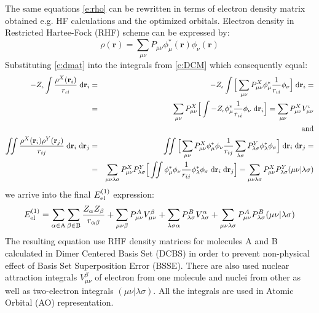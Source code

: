 \documentclass[a4paper,titlepage,twoside,fleqn]{article}
\begin{document}
The same equations \ref{e:rho} can be rewritten in terms of
electron density matrix obtained e.g. HF calculations and
the optimized orbitals. Electron density in Restricted Hartee-Fock
(RHF) scheme can be expressed by:
\begin{equation}\label{e:dmat}
\rho(\mathbf{r}) = \sum_{\mu\nu} P_{\mu\nu} \phi_{\mu}^{*}(\mathbf{r})  \phi_{\nu}(\mathbf{r})
\end{equation}   
Substituting \ref{e:dmat} into the integrals from \ref{e:DCM} 
which consequently equal:
\begin{eqnarray}
-Z_{\iota}\int \frac{\rho^X({\bf r}_i)  }{r_{\iota i}} \;{\rm d}{\bf r}_i 
&=&
-Z_{\iota}\int \Big[
     \sum_{\mu\nu} P^X_{\mu\nu} \phi_{\mu}^{*} \frac{1}{r_{\iota i}} \phi_{\nu} 
     \Big] \;{\rm d}{\bf r}_i = \\ \nonumber
&=&
\sum_{\mu\nu} P^X_{\mu\nu} 
 \Big[
 \int -Z_{\iota}\phi_{\mu}^{*} \frac{1}{r_{\iota i}} \phi_{\nu}\;{\rm d}{\bf r}_i
 \Big] %
=
\sum_{\mu\nu} P^X_{\mu\nu} V_{\mu\nu}^{\iota} \\\nonumber 
&&\textrm{  and}\\
%
\iint \frac{\rho^X({\bf r}_i)\rho^Y({\bf r}_j)  }{r_{ij}} \;{\rm d}{\bf r}_i \;{\rm d}{\bf r}_j 
&=&
\iint \Big[
       \sum_{\mu\nu} P^X_{\mu\nu} \phi_{\mu}^{*} \phi_{\nu} 
       \frac{1}{r_{ij}} 
       \sum_{\lambda\sigma} P^Y_{\lambda\sigma} \phi_{\lambda}^{*} \phi_{\sigma}
       \Big] 
       \;{\rm d}{\bf r}_i \;{\rm d}{\bf r}_j = \\ \nonumber
&=&
\sum_{\mu\nu\lambda\sigma} P^X_{\mu\nu} P^Y_{\lambda\sigma} 
   \Big[
     \iint \phi_{\mu}^{*} \phi_{\nu} 
           \frac{1}{r_{ij}} 
           \phi_{\lambda}^{*} \phi_{\sigma}
           \;{\rm d}{\bf r}_i \;{\rm d}{\bf r}_j
   \Big] 
=
\sum_{\mu\nu\lambda\sigma} P^X_{\mu\nu} P^Y_{\lambda\sigma}
(\mu\nu|\lambda\sigma)
\end{eqnarray}
we arrive into the final $E_{\rm el}^{(1)}$ expression:
\begin{equation}\label{e:eeleds}
E_{\rm el}^{(1)} = 
\sum_{\alpha \in {\rm A}} \sum_{\beta \in {\rm B}} \frac{Z_{\alpha}Z_{\beta}}{r_{\alpha\beta}} +
\sum_{\mu\nu\beta} P^A_{\mu\nu} V_{\mu\nu}^{\beta} +
\sum_{\lambda\sigma\alpha} P^B_{\lambda\sigma} V_{\lambda\sigma}^{\alpha} +
\sum_{\mu\nu\lambda\sigma} P^A_{\mu\nu} P^B_{\lambda\sigma} (\mu\nu|\lambda\sigma)
\end{equation} 
The resulting equation use RHF density matrices for 
molecules A and B calculated in Dimer Centered Basis Set 
(DCBS) in order to prevent non-physical effect of Basis 
Set Superposition Error (BSSE). There are also used 
nuclear attraction integrals $V_{\mu\nu}^{\beta}$ 
of electron from one molecule and nuclei from other as
well as two-electron integrals $(\mu\nu|\lambda\sigma)$.
All the integrals are used in Atomic Orbital (AO) 
representation.  
\end{document}
